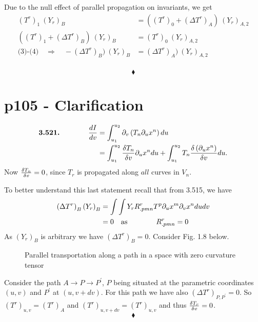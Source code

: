 Due to the null effect of  parallel propagation on invariants, we  get
\begin{align}
 (T^r)_1\ (Y_r)_{B} &= ((T^r)_0+ (\Delta T^r)_{A})\ (Y_r)_{A,2}\\
 ((T^r)_1+(\Delta T^r)_B )\ (Y_r)_{B}&=(T^r)_0 \ (Y_r)_{A,2}\\
 \text{(3)-(4)}\quad \Rightarrow \quad -(\Delta T^r)_B )\ (Y_r)_{B}&=(\Delta T^r)_{A})\ (Y_r)_{A,2}
\end{align}\\
$$\blacklozenge$$
\newpage


\section{p105 - Clarification}
\begin{tcolorbox}
\begin{align*}
\textbf{3.521.} \spatie \dv{I}{v} &= \int_{u_1}^{u_2}\partial_v\left(T_n\partial_u x^n\right)du\\
&= \int_{u_1}^{u_2}\fdv{T_n}{v}\partial_u x^n du + \int_{u_1}^{u_2}T_n\fdv{\left(\partial_u x^n\right)}{v} du. 
\end{align*}
Now $\fdv{T_n}{v}=0$, since $T_r$ is propagated along $\textit{all}$ curves in $V_n$.
\end{tcolorbox}
To better understand this last statement recall that from 3.515, we have
\begin{align*}
 \left( \Delta T^r \right)_B \left( Y_r \right)_B &= \int \int Y_rR^r_{.pmn}T^p\partial _u x^m \partial _v x^n du dv\\
 &= 0 \quad \text{as} \quad\quad\quad\quad R^r_{.pmn}=0
\end{align*}
As $\left( Y_r \right)_B$ is arbitrary we have $\left( \Delta T^r \right)_B =0$. Consider Fig. 1.8 below.\\
\begin{figure}[H]
\center

\caption{Parallel transportation along a path in a space with zero curvature tensor}
\end{figure}
Consider the path $A\rightarrow P \rightarrow P^{'}$, $ P$ being situated at the parametric coordinates $(u, v)$ and $P^{'}$ at $(u, v + dv)$. For this path we have also $\left( \Delta T^r \right)_{P,P^{'}} =0$. So $(T^r)_{u,v} = (T^r)_A$ and $(T^r)_{u,v+dv} = (T^r)_{u,v}$ and thus $\fdv{T_r}{v}=0$.
$$\blacklozenge$$
\newpage


